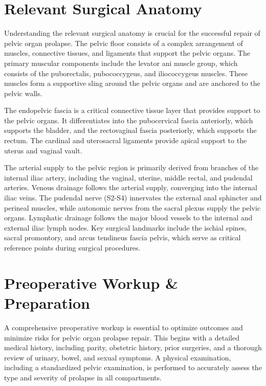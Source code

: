 \section*{Relevant Surgical Anatomy}
Understanding the relevant surgical anatomy is crucial for the successful repair of pelvic organ prolapse. The pelvic floor consists of a complex arrangement of muscles, connective tissues, and ligaments that support the pelvic organs. The primary muscular components include the levator ani muscle group, which consists of the puborectalis, pubococcygeus, and iliococcygeus muscles. These muscles form a supportive sling around the pelvic organs and are anchored to the pelvic walls.

The endopelvic fascia is a critical connective tissue layer that provides support to the pelvic organs. It differentiates into the pubocervical fascia anteriorly, which supports the bladder, and the rectovaginal fascia posteriorly, which supports the rectum. The cardinal and uterosacral ligaments provide apical support to the uterus and vaginal vault. 

The arterial supply to the pelvic region is primarily derived from branches of the internal iliac artery, including the vaginal, uterine, middle rectal, and pudendal arteries. Venous drainage follows the arterial supply, converging into the internal iliac veins. The pudendal nerve (S2-S4) innervates the external anal sphincter and perineal muscles, while autonomic nerves from the sacral plexus supply the pelvic organs. Lymphatic drainage follows the major blood vessels to the internal and external iliac lymph nodes. Key surgical landmarks include the ischial spines, sacral promontory, and arcus tendineus fascia pelvis, which serve as critical reference points during surgical procedures.

\section*{Preoperative Workup \& Preparation}
A comprehensive preoperative workup is essential to optimize outcomes and minimize risks for pelvic organ prolapse repair. This begins with a detailed medical history, including parity, obstetric history, prior surgeries, and a thorough review of urinary, bowel, and sexual symptoms. A physical examination, including a standardized pelvic examination, is performed to accurately assess the type and severity of prolapse in all compartments.

